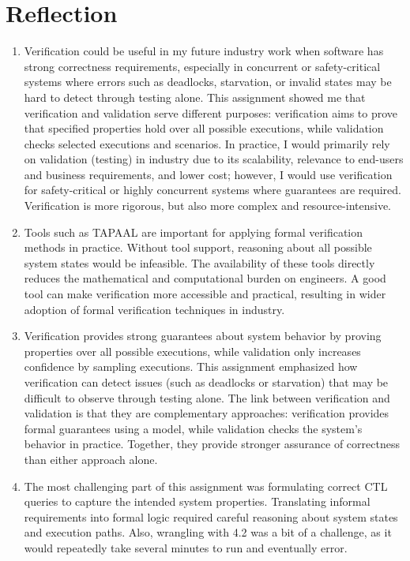 \section{Reflection}
\begin{enumerate}

    \item Verification could be useful in my future industry work when 
    software has strong correctness requirements, especially in 
    concurrent or safety-critical systems where errors such as deadlocks, 
    starvation, or invalid 
    states may be hard to detect through testing alone. This 
    assignment showed me that verification and validation serve 
    different purposes: verification aims to prove that specified 
    properties hold over all possible executions, while validation 
    checks selected executions and 
    scenarios. In practice, I would primarily rely on validation (testing) 
    in industry due to its scalability, relevance to end-users and business requirements,
    and lower cost; however, I would use 
    verification for safety-critical or highly concurrent systems 
    where guarantees are required. Verification is more rigorous, 
    but also more complex and resource-intensive.   

    \item Tools such as TAPAAL are important for applying formal 
    verification methods in practice. Without tool support, reasoning 
    about all possible system states would be infeasible. The 
    availability of these tools directly reduces the mathematical and 
    computational burden on engineers. A good tool can make verification
    more accessible and practical, resulting in wider adoption of formal
    verification techniques in industry. 

    \item Verification provides strong guarantees about system behavior 
    by proving properties over all possible executions, while validation only increases confidence by sampling executions. This 
    assignment emphasized how verification can detect issues (such as 
    deadlocks or starvation) that may be difficult to observe through 
    testing alone. The link between verification and validation is that they are 
    complementary approaches: verification provides formal guarantees 
    using a model, while validation checks the system's behavior 
    in practice. Together, they provide stronger assurance of correctness 
    than either approach alone.

    \item The most challenging part of this assignment was formulating 
    correct CTL queries to capture the intended system 
    properties. Translating informal requirements into formal logic required 
    careful reasoning about 
    system states and execution paths.
    Also, wrangling with 4.2 was a bit of a challenge, as it 
    would repeatedly take several minutes to run and eventually error.
\end{enumerate}